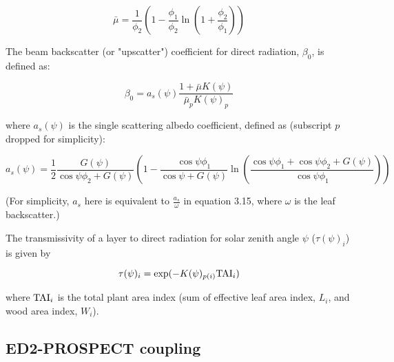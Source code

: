 \begin{equation}
  \bar\mu = \frac{1}{\phi_{2}}\left( 1 - \frac{\phi_{1}}{\phi_{2}} \ln\left( 1 + \frac{\phi_{2}}{\phi_{1}}\right) \right)
\end{equation}

The beam backscatter (or "upscatter") coefficient for direct radiation, $\beta_0$, is defined as:

\begin{equation}
  \beta_{0} = a_s(\psi) \frac{1 + \bar\mu K(\psi)}{\bar\mu_{p} K(\psi)_{p}}
\end{equation}

where $a_s(\psi)$ is the single scattering albedo coefficient, defined as (subscript $p$ dropped for simplicity):

\begin{equation}
  a_s(\psi) = \frac{1}{2}
  \frac{G(\psi)}{\cos\psi \phi_2 + G(\psi)}
  \left(
    1 -
    \frac{\cos\psi \phi_1}{\cos\psi + G(\psi)}
    \ln\left(
      \frac{\cos\psi \phi_1 + \cos\psi \phi_2 + G(\psi)}{\cos\psi \phi_1}
    \right)
  \right)
\end{equation}

(For simplicity, $a_s$ here is equivalent to $\frac{a_s}{\omega}$ in \citet{clm45_note} equation 3.15, where $\omega$ is the leaf backscatter.)

The transmissivity of a layer to direct radiation for solar zenith angle $\psi$ ($\tau(\psi)_i$) is given by

\begin{equation}
  \tau(\psi)_i = \exp(-K(\psi)_{p(i)} \mathrm{TAI}_i)
\end{equation}

where $\mathrm{TAI}_{i}$ is the total plant area index (sum of effective leaf area index, $L_{i}$, and wood area index, $W_{i}$).

\subsection{ED2-PROSPECT coupling}

